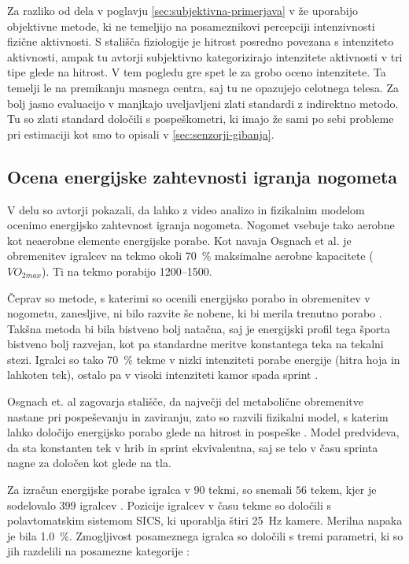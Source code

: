 Za razliko od dela v poglavju \ref{sec:subjektivna-primerjava} v \cite{silva2015assessing} že uporabijo objektivne metode, ki ne temeljijo na posameznikovi percepciji intenzivnosti fizične aktivnosti. S stališča fiziologije je hitrost posredno povezana s intenziteto aktivnosti, ampak tu avtorji subjektivno kategorizirajo intenzitete aktivnosti v tri tipe glede na hitrost. V tem pogledu gre spet le za grobo oceno intenzitete. Ta temelji le na premikanju masnega centra, saj tu ne opazujejo celotnega telesa. Za bolj jasno evaluacijo v \cite{silva2015assessing} manjkajo uveljavljeni zlati standardi z indirektno metodo. Tu so zlati standard določili s pospeškometri, ki imajo že sami po sebi probleme pri estimaciji kot smo to opisali v \ref{sec:senzorji-gibanja}.




\subsection{Ocena energijske zahtevnosti igranja nogometa}

V delu \cite{osgnach2010energy} so avtorji pokazali, da lahko z video analizo in fizikalnim modelom ocenimo energijsko zahtevnost igranja nogometa. Nogomet vsebuje tako aerobne kot neaerobne elemente energijske porabe. Kot navaja Osgnach et al. \cite{osgnach2010energy} je obremenitev igralcev na tekmo okoli \SI{70}{\%} maksimalne aerobne kapacitete ($VO_{2max}$). Ti na tekmo porabijo \SI{1200}{\kcal}--\SI{1500}{\kcal}. 

Čeprav so metode, s katerimi so ocenili energijsko porabo in obremenitev v nogometu, zanesljive, ni bilo razvite še nobene, ki bi merila trenutno porabo \cite{osgnach2010energy}. Takšna metoda bi bila bistveno bolj natačna, saj je energijski profil tega športa bistveno bolj razvejan, kot pa standardne meritve konstantega teka na tekalni stezi. Igralci so tako \SI{70}{\%} tekme v nizki intenziteti porabe energije (hitra hoja in lahkoten tek), ostalo pa v visoki intenziteti kamor spada sprint \cite{osgnach2010energy}. 

Osgnach et. al \cite{osgnach2010energy} zagovarja stališče, da največji del metabolične obremenitve nastane pri pospeševanju in zaviranju, zato so razvili fizikalni model, s katerim lahko določijo energijsko porabo glede na hitrost in pospeške \cite{osgnach2010energy}. Model predvideva, da sta konstanten tek v hrib in sprint ekvivalentna, saj se telo v času sprinta nagne za določen kot glede na tla.  

Za izračun energijske porabe igralca v \SI{90}{\min} tekmi, so snemali $56$ tekem, kjer je sodelovalo $399$ igralcev \cite{osgnach2010energy}. Pozicije igralcev v času tekme so določili s polavtomatskim sistemom SICS, ki uporablja štiri \SI{25}{\Hz} kamere. Merilna napaka je bila \SI{1.0}{\%}. Zmogljivost posameznega igralca so določili s tremi parametri, ki so jih razdelili na posamezne kategorije \cite{osgnach2010energy}:

